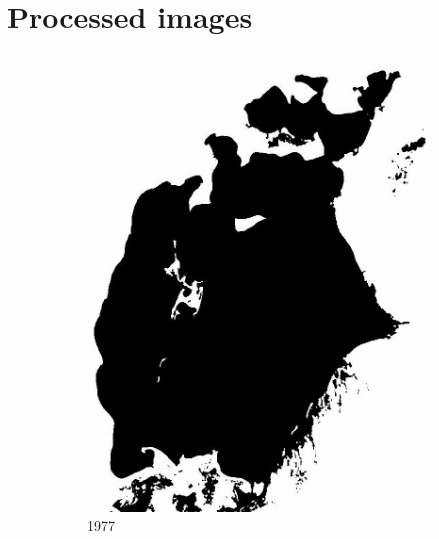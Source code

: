 \documentclass[12pt,a4paper]{article}
\begin{document}
\section{Processed images}

\begin{figure}
    \centering
    \begin{subfigure}[b]{0.19\textwidth}
        \centering
        \includegraphics[width=\textwidth]{../img/1977w.jpg}
        \caption{1977}
    \end{subfigure}
    \begin{subfigure}[b]{0.19\textwidth}
        \centering

\end{subfigure}
\end{figure}
\end{document}
